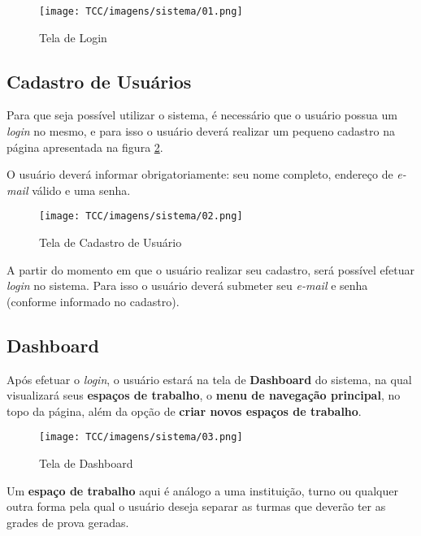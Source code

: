 \begin{anexosenv}
\begin{figure}[H]
     \centering
     \texttt{[image: TCC/imagens/sistema/01.png]}
     \caption{Tela de Login}
     \label{tela-login}
\end{figure}

\subsection{Cadastro de Usuários}

Para que seja possível utilizar o sistema, é necessário que o usuário possua um \textit{login} no mesmo, e para isso o usuário deverá realizar um pequeno cadastro na página apresentada na figura \ref{tela-cadastro-usuario}. 

O usuário deverá informar obrigatoriamente: seu nome completo, endereço de \textit{e-mail} válido e uma senha.

\begin{figure}[H]
     \centering
     \texttt{[image: TCC/imagens/sistema/02.png]}
     \caption{Tela de Cadastro de Usuário}
     \label{tela-cadastro-usuario}
\end{figure}

A partir do momento em que o usuário realizar seu cadastro, será possível efetuar \textit{login} no sistema. Para isso o usuário deverá submeter seu \textit{e-mail} e senha (conforme informado no cadastro).


\subsection{Dashboard}

Após efetuar o \textit{login}, o usuário estará na tela de \textbf{Dashboard} do sistema, na qual visualizará seus \textbf{espaços de trabalho}, o \textbf{menu de navegação principal}, no topo da página, além da opção de \textbf{criar novos espaços de trabalho}.

\begin{figure}[H]
     \centering
     \texttt{[image: TCC/imagens/sistema/03.png]}
     \caption{Tela de Dashboard}
     \label{tela-dashboard}
\end{figure}

Um \textbf{espaço de trabalho} aqui é análogo a uma instituição, turno ou qualquer outra forma pela qual o usuário deseja separar as turmas que deverão ter as grades de prova geradas.


\end{anexosenv}
